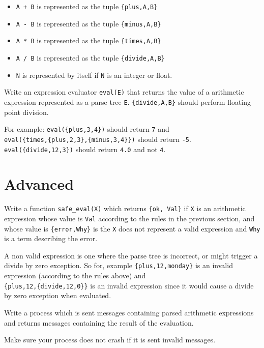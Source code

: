 \documentclass[12pt]{hitec}
\begin{document}
\begin{itemize}
\item \verb=A + B= is represented as the tuple \verb+{plus,A,B}+
\item \verb=A - B= is represented as the tuple \verb+{minus,A,B}+
\item \verb=A * B= is represented as the tuple \verb+{times,A,B}+
\item \verb=A / B= is represented as the tuple \verb+{divide,A,B}+
\item \verb+N+ is represented by itself if \verb+N+ is an integer or float.
\end{itemize}

Write an expression evaluator \verb+eval(E)+ that returns the value of a arithmetic
expression represented as a parse tree \verb+E+. \verb+{divide,A,B}+ should
perform floating point division.

For example:
\verb+eval({plus,3,4})+ should return \verb+7+ and
\\
\verb+eval({times,{plus,2,3},{minus,3,4}})+ should return \verb+-5+.
\\
\verb+eval({divide,12,3})+ should return \verb+4.0+ and not \verb+4+.



\section{Advanced}
Write a function \verb+safe_eval(X)+ which returns \verb+{ok, Val}+
if \verb+X+ is an arithmetic expression whose value is \verb+Val+ according
to the rules in the previous section, and whose value is \verb+{error,Why}+
is the \verb+X+ does not represent a valid expression and \verb+Why+
is a term describing the error.

A non valid expression is one where the parse tree is incorrect, or
might trigger a divide by zero exception. So for, example
\verb+{plus,12,monday}+ is an invalid expression (according to the rules
above) and
\\
\verb+{plus,12,{divide,12,0}}+ is an invalid expression
since it would cause a divide by zero exception when evaluated.

Write a process which is sent messages containing parsed arithmetic expressions and returns
messages containing the result of the evaluation.

Make sure your process does not crash if it is sent invalid messages.
\end{document}
